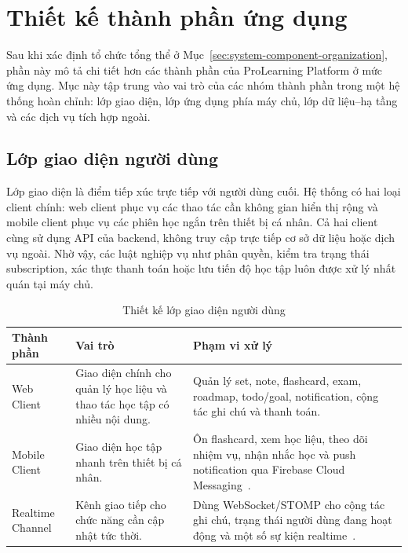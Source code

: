 \section{Thiết kế thành phần ứng dụng}
\label{sec:application-component-design}
\begingroup
\sloppy

Sau khi xác định tổ chức tổng thể ở Mục~\ref{sec:system-component-organization}, phần này mô tả chi tiết hơn các thành phần của ProLearning Platform ở mức ứng dụng. Mục này tập trung vào vai trò của các nhóm thành phần trong một hệ thống hoàn chỉnh: lớp giao diện, lớp ứng dụng phía máy chủ, lớp dữ liệu--hạ tầng và các dịch vụ tích hợp ngoài.

\subsection{Lớp giao diện người dùng}
\label{subsec:client-application-design}

Lớp giao diện là điểm tiếp xúc trực tiếp với người dùng cuối. Hệ thống có hai loại client chính: web client phục vụ các thao tác cần không gian hiển thị rộng và mobile client phục vụ các phiên học ngắn trên thiết bị cá nhân. Cả hai client cùng sử dụng API của backend, không truy cập trực tiếp cơ sở dữ liệu hoặc dịch vụ ngoài. Nhờ vậy, các luật nghiệp vụ như phân quyền, kiểm tra trạng thái subscription, xác thực thanh toán hoặc lưu tiến độ học tập luôn được xử lý nhất quán tại máy chủ.

\begin{table}[htbp]
    \centering
    \small
    \caption{Thiết kế lớp giao diện người dùng}
    \label{tab:client-application-design}
    \renewcommand{\arraystretch}{1.15}
    \begin{tabular}{|p{}|p{}|p{}|}
        \hline
        \textbf{Thành phần} & \textbf{Vai trò} & \textbf{Phạm vi xử lý} \\
        \hline
        Web Client & Giao diện chính cho quản lý học liệu và thao tác học tập có nhiều nội dung. & Quản lý set, note, flashcard, exam, roadmap, todo/goal, notification, cộng tác ghi chú và thanh toán. \\
        \hline
        Mobile Client & Giao diện học tập nhanh trên thiết bị cá nhân. & Ôn flashcard, xem học liệu, theo dõi nhiệm vụ, nhận nhắc học và push notification qua Firebase Cloud Messaging~\cite{firebasefcm}. \\
        \hline
        Realtime Channel & Kênh giao tiếp cho chức năng cần cập nhật tức thời. & Dùng WebSocket/STOMP cho cộng tác ghi chú, trạng thái người dùng đang hoạt động và một số sự kiện realtime~\cite{springwebsocketstomp}. \\
        \hline
    \end{tabular}
\end{table}

